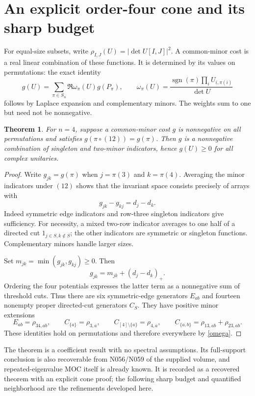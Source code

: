 \documentclass[11pt]{article}
\newtheorem{theorem}{Theorem}[section]\newtheorem{lemma}[theorem]{Lemma}\newtheorem{corollary}[theorem]{Corollary}\newtheorem{proposition}[theorem]{Proposition}
\begin{document}
\section{An explicit order-four cone and its sharp budget}
For equal-size subsets, write $\rho_{I,J}(U)=|\det U[I,J]|^2$. A common-minor cost is a real linear combination of these functions. It is determined by its values on permutations: the exact identity
\begin{equation}\label{omega}
g(U)=\sum_{\pi\in S_n}\Re\omega_\pi(U)g(P_\pi),\qquad
\omega_\pi(U)=\frac{\operatorname{sgn}(\pi)\prod_i U_{i,\pi(i)}}{\det U}
\end{equation}
follows by Laplace expansion and complementary minors. The weights sum to one but need not be nonnegative.

\begin{theorem}\label{cone}
For $n=4$, suppose a common-minor cost $g$ is nonnegative on all permutations and satisfies $g(\pi\circ(12))=g(\pi)$. Then $g$ is a nonnegative combination of singleton and two-minor indicators, hence $g(U)\ge0$ for all complex unitaries.
\end{theorem}
\begin{proof}
Write $g_{jk}=g(\pi)$ when $j=\pi(3)$ and $k=\pi(4)$. Averaging the minor indicators under $(12)$ shows that the invariant space consists precisely of arrays with
\[
g_{jk}-g_{kj}=d_j-d_k.
\]
Indeed symmetric edge indicators and row-three singleton indicators give sufficiency. For necessity, a mixed two-row indicator averages to one half of a directed cut $1_{j\in S,k\notin S}$; the other indicators are symmetric or singleton functions. Complementary minors handle larger sizes.

Set $m_{jk}=\min(g_{jk},g_{kj})\ge0$. Then
\[
g_{jk}=m_{jk}+(d_j-d_k)_+.
\]
Ordering the four potentials expresses the latter term as a nonnegative sum of threshold cuts. Thus there are six symmetric-edge generators $E_{ab}$ and fourteen nonempty proper directed-cut generators $C_S$. They have positive minor extensions
\[
E_{ab}=\rho_{34,ab},\qquad C_{\{a\}}=\rho_{3,a},\qquad
C_{[4]\setminus\{a\}}=\rho_{4,a},\qquad
C_{\{a,b\}}=\rho_{13,ab}+\rho_{23,ab}.
\]
These identities hold on permutations and therefore everywhere by \eqref{omega}.
\end{proof}

The theorem is a coefficient result with no spectral assumptions. Its full-support conclusion is also recoverable from N056/N059 of the supplied volume, and repeated-eigenvalue MOC itself is already known. It is recorded as a recovered theorem with an explicit cone proof; the following sharp budget and quantified neighborhood are the refinements developed here.
\end{document}
